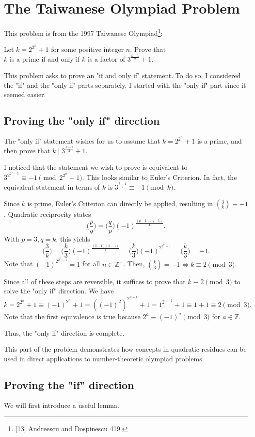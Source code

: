 \documentclass{article}
\newcommand{\Z}{\mathbb{Z}}
\newcommand{\qrbg}[2]{\bigg( \frac{#1}{#2}\bigg)}
\newcommand{\qrn}[2]{\left( \frac{#1}{#2}\right)}
\begin{document}
\section{The Taiwanese Olympiad Problem}
This problem is from the 1997 Taiwanese Olympiad\footnote{[13] Andreescu and Dospinescu 419.}:
\begin{center}
Let $k=2^{2^n}+1$ for some positive integer $n$. Prove that \\ $k$ is a prime if and only if $k$ is a factor of $3^{\frac{k-1}{2}}+1$.
\end{center}
This problem asks to prove an "if and only if" statement. To do so, I considered the "if" and the "only if" parts separately. I started with the "only if" part since it seemed easier.
\subsection{Proving the "only if" direction}
The "only if" statement wishes for us to assume that $k=2^{2^n}+1$ is a prime, and then prove that $k \mid 3^{\frac{k-1}{2}} + 1$.

I noticed that the statement we wish to prove is equivalent to $3^{2^{2^n-1}} \equiv -1 \pmod{2^{2^n}+1}$.
This looks similar to Euler's Criterion. In fact, the equivalent statement in terms of $k$ is $3^{\frac{k-1}{2}} \equiv -1 \pmod k$.

Since $k$ is prime, Euler's Criterion can directly be applied, resulting in $\qrn{3}{k} \equiv -1$. Quadratic reciprocity states
\[\qrbg{p}{q} = \qrbg{q}{p}(-1)^{\frac{(p-1)(q-1)}{4}}.\]
With $p=3, q=k$, this yields
\[\qrbg{3}{k}=\qrbg{k}{3} (-1)^{\frac{(3-1)(k-1)}{4}}=\qrbg{k}{3}(-1)^{2^{2^n-1}}=\qrbg{k}{3}=-1.\]
Note that $(-1)^{2^{2^n-1}}=1$ for all $n \in \Z^+$. Then, $\qrn{k}{3} = -1 \iff k \equiv 2 \pmod 3$.

Since all of these steps are reversible, it suffices to prove that $k \equiv 2 \pmod 3$ to solve the "only if" direction. We have \[k = 2^{2^n}+1 \equiv (-1)^{2^n}+1 = ((-1)^2)^{2^{n-1}}+1 = 1^{2^{n-1}}+1 \equiv 1+1 \equiv 2 \pmod 3.\]
Note that the first equivalence is true because $2^a \equiv (-1)^a \pmod 3$ for $a \in \Z$.

Thus, the "only if" direction is complete. 

This part of the problem demonstrates how concepts in quadratic residues can be used in direct applications to number-theoretic olympiad problems. 

\subsection{Proving the "if" direction}
We will first introduce a useful lemma.
\end{document}
